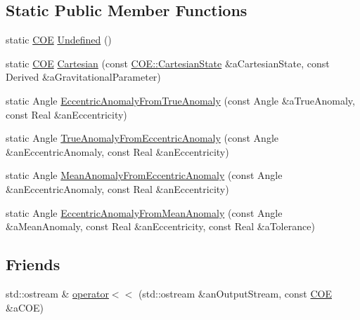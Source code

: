 \subsection*{Static Public Member Functions}
\begin{DoxyCompactItemize}
\item 
static \hyperlink{classostk_1_1astro_1_1trajectory_1_1orbit_1_1models_1_1kepler_1_1_c_o_e}{C\+OE} \hyperlink{classostk_1_1astro_1_1trajectory_1_1orbit_1_1models_1_1kepler_1_1_c_o_e_a65869bb9f9417dde5e230bbd4ab52fac}{Undefined} ()
\item 
static \hyperlink{classostk_1_1astro_1_1trajectory_1_1orbit_1_1models_1_1kepler_1_1_c_o_e}{C\+OE} \hyperlink{classostk_1_1astro_1_1trajectory_1_1orbit_1_1models_1_1kepler_1_1_c_o_e_a6fd98b5a37cd8143667c47418513fea5}{Cartesian} (const \hyperlink{classostk_1_1astro_1_1trajectory_1_1orbit_1_1models_1_1kepler_1_1_c_o_e_a410fdbf5aa25ed4651f1b7337c678edc}{C\+O\+E\+::\+Cartesian\+State} \&a\+Cartesian\+State, const Derived \&a\+Gravitational\+Parameter)
\item 
static Angle \hyperlink{classostk_1_1astro_1_1trajectory_1_1orbit_1_1models_1_1kepler_1_1_c_o_e_a862d6d129ee8b17faa4b786ffec9e1f4}{Eccentric\+Anomaly\+From\+True\+Anomaly} (const Angle \&a\+True\+Anomaly, const Real \&an\+Eccentricity)
\item 
static Angle \hyperlink{classostk_1_1astro_1_1trajectory_1_1orbit_1_1models_1_1kepler_1_1_c_o_e_a840b51ad645eee26060462d8ffff83af}{True\+Anomaly\+From\+Eccentric\+Anomaly} (const Angle \&an\+Eccentric\+Anomaly, const Real \&an\+Eccentricity)
\item 
static Angle \hyperlink{classostk_1_1astro_1_1trajectory_1_1orbit_1_1models_1_1kepler_1_1_c_o_e_ac45f3543991d1c81a0341e141713126f}{Mean\+Anomaly\+From\+Eccentric\+Anomaly} (const Angle \&an\+Eccentric\+Anomaly, const Real \&an\+Eccentricity)
\item 
static Angle \hyperlink{classostk_1_1astro_1_1trajectory_1_1orbit_1_1models_1_1kepler_1_1_c_o_e_a03697221660ff4c30f4eb19ecdc89159}{Eccentric\+Anomaly\+From\+Mean\+Anomaly} (const Angle \&a\+Mean\+Anomaly, const Real \&an\+Eccentricity, const Real \&a\+Tolerance)
\end{DoxyCompactItemize}
\subsection*{Friends}
\begin{DoxyCompactItemize}
\item 
std\+::ostream \& \hyperlink{classostk_1_1astro_1_1trajectory_1_1orbit_1_1models_1_1kepler_1_1_c_o_e_a32e0ab4a9a11b3315114f2932c58f68c}{operator$<$$<$} (std\+::ostream \&an\+Output\+Stream, const \hyperlink{classostk_1_1astro_1_1trajectory_1_1orbit_1_1models_1_1kepler_1_1_c_o_e}{C\+OE} \&a\+C\+OE)
\end{DoxyCompactItemize}


